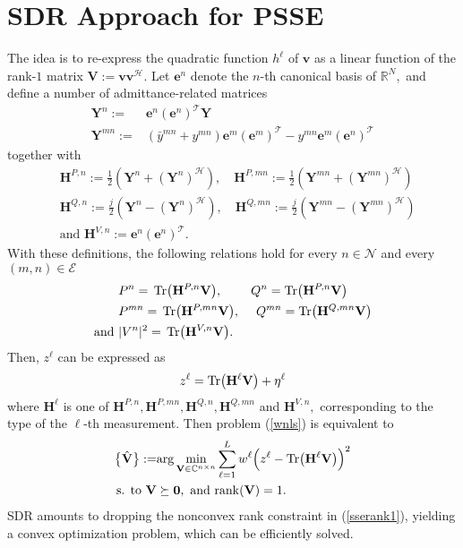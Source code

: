 \documentclass[conference]{IEEEtran}
\def\ccalE{{\ensuremath{\mathcal E}}}
\def\ccalH{{\ensuremath{\mathcal H}}}
\def\ccalN{{\ensuremath{\mathcal N}}}
\def\ccalT{{\ensuremath{\mathcal T}}}
\def\bbH{{\ensuremath{\mathbf H}}}
\def\bbV{{\ensuremath{\mathbf V}}}
\def\bbY{{\ensuremath{\mathbf Y}}}
\def\bbe{{\ensuremath{\mathbf e}}}
\def\bbv{{\ensuremath{\mathbf v}}}
\def\bb0{{\ensuremath{\mathbf 0}}}
\begin{document}
\section{SDR Approach for PSSE}
\label{sec3}
The idea is to re-express the quadratic function $h^\ell$ of $\bbv$ as a linear function of the  rank-$1$ matrix ${\bbV}:={\bbv\bbv^{\ccalH}}.$ Let $\bbe^n$ denote the $n$-th canonical basis of $\mathbb{R}^N,$ and define a number of admittance-related matrices
\begin{align}
\bbY^n:=&\bbe^n(\bbe^n)^{\ccalT}\bbY\nonumber\\
\bbY^{mn}:=&(\bar{y}^{mn}+y^{mn})\bbe^m(\bbe^m)^\ccalT-y^{mn}\bbe^m
(\bbe^n)^\ccalT\label{yml}
\end{align}
together with
\begin{align}
&\bbH^{P,n}:=\frac{1}{2}\left(\bbY^n\!+\!(\bbY^n)^{\ccalH}\right),\quad\!\!
\bbH^{P,mn}:=\frac{1}{2}\left(\bbY^{mn}\!+\!(\bbY^{mn})^{\ccalH}\right)\nonumber\\
&\bbH^{Q,n}:=\frac{j}{2}\left(\bbY^n\!-\!(\bbY^n)^{\ccalH}\right),\quad\!\!
\bbH^{Q,mn}:=\frac{j}{2}\left(\bbY^{mn}\!-\!(\bbY^{mn})^{\ccalH}\right)\nonumber\\
&{\text{and~}}\bbH^{V,n}:=\bbe^n(\bbe^n)^\ccalT.\label{hvn}
\end{align}
With these definitions, the following relations hold for every $n\in\ccalN$ and every $(m,n)\in\ccalE$
\begin{align}
&P^n=\,{\rm{Tr}}\big(\bbH^{P,n}\bbV\big),\qquad \; Q^n={\rm{Tr}}\big(\bbH^{P,n}\bbV\big)\nonumber\\
&P^{mn}=\,{\rm{Tr}}\big(\bbH^{P,mn}\bbV\big),\quad \; Q^{mn}={\rm{Tr}}\big(\bbH^{Q,mn}\bbV\big)\nonumber\\
{\text{and~}}&|V^n|^2=\,{\rm{Tr}}\big(\bbH^{V,n}\bbV\big)\label{vn}.
\end{align}
Then, $z^\ell$ can be expressed as
\begin{align}
z^\ell={\rm{Tr}}\big(\bbH^\ell\bbV\big)+\eta^\ell \end{align}
where $\bbH^\ell$ is one of $\bbH^{P,n}, \bbH^{P,mn}, \bbH^{Q,n}, \bbH^{Q,mn}$ and $\bbH^{V,n},$ corresponding to the type of the $\ell$-th measurement. Then problem (\ref{wnls}) is equivalent to
\begin{subequations}
\begin{align}
\big\{\hat\bbV\big\}:=&{\rm{arg}}\mathop{\rm{min}}
\limits_{\bbV\in\mathbb{C}^{n\times n}}\sum_{\ell=1}^{L}w^\ell\Big(z^\ell-{\rm{Tr}}\big(\bbH^\ell\bbV\big)\Big)^2\label{ssevkn}\\
{\text{s. to}}~ \bbV&\succeq \bb0,~{\text{and}}~{\rm{rank}}(\bbV)=1\label{sserank1}.
\end{align}
\end{subequations}
SDR amounts to dropping the nonconvex rank constraint in (\ref{sserank1}), yielding a convex optimization problem, which can be efficiently solved.
\end{document}
